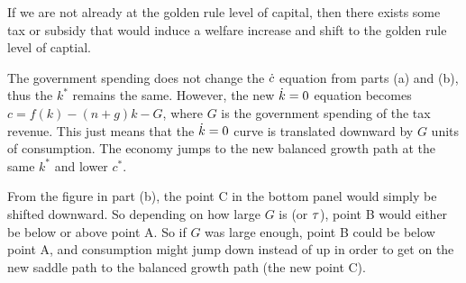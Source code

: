 \documentclass[12pt]{article}
\begin{document}
If we are not already at the golden rule level of capital, then there exists some tax or subsidy that would induce a welfare increase and shift to the golden rule level of captial.




\newpage{}

The government spending does not change the $\dot c$ equation from parts (a) and (b), thus the $k^*$ remains the same. However, the new $\dot k=0$ equation becomes $c=f(k)-(n+g)k-G$, where $G$ is the government spending of the tax revenue. This just means that the $\dot k=0$ curve is translated downward by $G$ units of consumption. The economy jumps to the new balanced growth path at the same $k^*$ and lower $c^*$. 

From the figure in part (b), the point C in the bottom panel would simply be shifted downward. So depending on how large $G$ is (or $\tau$), point B would either be below or above point A. So if $G$ was large enough, point B could be below point A, and consumption might jump down instead of up in order to get on the new saddle path to the balanced growth path (the new point C).
\end{document}

